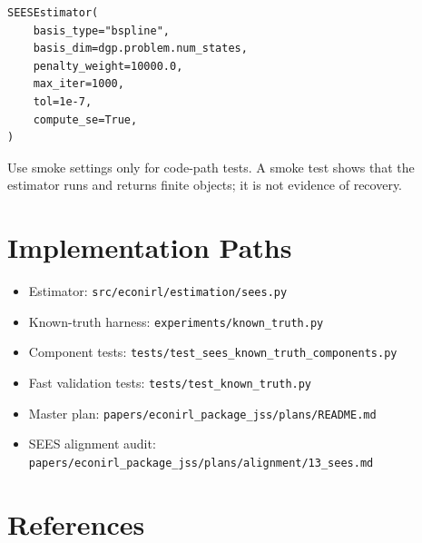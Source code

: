 \documentclass[10pt]{article}
\begin{document}
\begin{lstlisting}
SEESEstimator(
    basis_type="bspline",
    basis_dim=dgp.problem.num_states,
    penalty_weight=10000.0,
    max_iter=1000,
    tol=1e-7,
    compute_se=True,
)
\end{lstlisting}

Use smoke settings only for code-path tests. A smoke test shows that the
estimator runs and returns finite objects; it is not evidence of recovery.

\section{Implementation Paths}

\begin{itemize}
\item Estimator: \texttt{src/econirl/estimation/sees.py}
\item Known-truth harness: \texttt{experiments/known\_truth.py}
\item Component tests: \texttt{tests/test\_sees\_known\_truth\_components.py}
\item Fast validation tests: \texttt{tests/test\_known\_truth.py}
\item Master plan: \texttt{papers/econirl\_package\_jss/plans/README.md}
\item SEES alignment audit: \texttt{papers/econirl\_package\_jss/plans/alignment/13\_sees.md}
\end{itemize}

\section{References}



\end{document}
